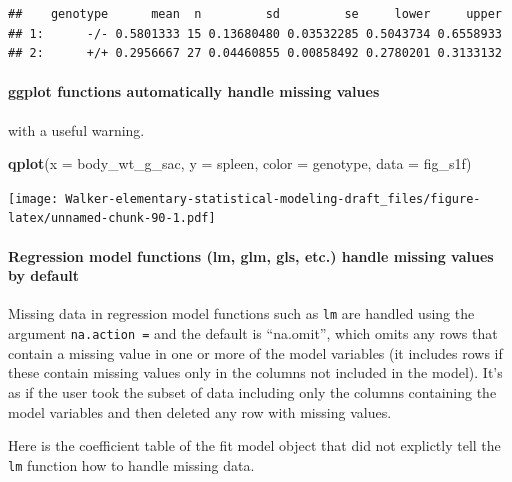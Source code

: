 \documentclass[]{book}
\newenvironment{Shaded}{\begin{snugshade}}{\end{snugshade}}
\newcommand{\DataTypeTok}[1]{\textcolor[rgb]{0.13,0.29,0.53}{#1}}
\newcommand{\KeywordTok}[1]{\textcolor[rgb]{0.13,0.29,0.53}{\textbf{#1}}}
\newcommand{\NormalTok}[1]{#1}
\let\oldparagraph\paragraph
\renewcommand{\paragraph}[1]{\oldparagraph{#1}\mbox{}}
\begin{document}
\begin{verbatim}
##    genotype      mean  n         sd         se     lower     upper
## 1:      -/- 0.5801333 15 0.13680480 0.03532285 0.5043734 0.6558933
## 2:      +/+ 0.2956667 27 0.04460855 0.00858492 0.2780201 0.3133132
\end{verbatim}

\hypertarget{ggplot-functions-automatically-handle-missing-values}{%
\paragraph{ggplot functions automatically handle missing values}\label{ggplot-functions-automatically-handle-missing-values}}

with a useful warning.

\begin{Shaded}
\begin{Highlighting}[]
\KeywordTok{qplot}\NormalTok{(}\DataTypeTok{x =}\NormalTok{ body_wt_g_sac,}
      \DataTypeTok{y =}\NormalTok{ spleen,}
      \DataTypeTok{color =}\NormalTok{ genotype,}
      \DataTypeTok{data =}\NormalTok{ fig_s1f)}
\end{Highlighting}
\end{Shaded}

\texttt{[image: Walker-elementary-statistical-modeling-draft\_files/figure-latex/unnamed-chunk-90-1.pdf]}

\hypertarget{regression-model-functions-lm-glm-gls-etc.-handle-missing-values-by-default}{%
\paragraph{Regression model functions (lm, glm, gls, etc.) handle missing values by default}\label{regression-model-functions-lm-glm-gls-etc.-handle-missing-values-by-default}}

Missing data in regression model functions such as \texttt{lm} are handled using the argument \texttt{na.action\ =} and the default is ``na.omit'', which omits any rows that contain a missing value in one or more of the model variables (it includes rows if these contain missing values only in the columns not included in the model). It's as if the user took the subset of data including only the columns containing the model variables and then deleted any row with missing values.

Here is the coefficient table of the fit model object that did not explictly tell the \texttt{lm} function how to handle missing data.
\end{document}
